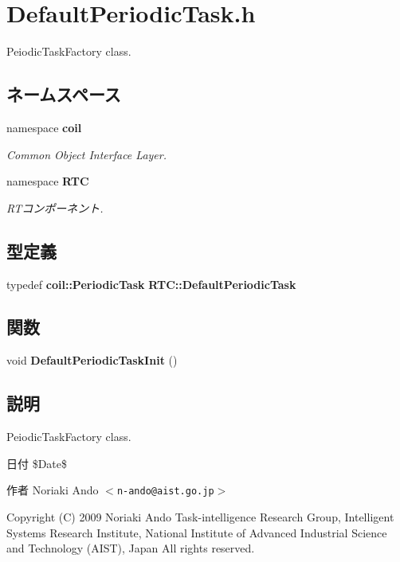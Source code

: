 \section{DefaultPeriodicTask.h}
\label{DefaultPeriodicTask_8h}


PeiodicTaskFactory class.  


\subsection*{ネームスペース}
\begin{DoxyCompactItemize}
\item 
namespace {\bf coil}


\begin{DoxyCompactList}\small\item\em Common Object Interface Layer. \item\end{DoxyCompactList}

\item 
namespace {\bf RTC}


\begin{DoxyCompactList}\small\item\em RTコンポーネント. \item\end{DoxyCompactList}

\end{DoxyCompactItemize}
\subsection*{型定義}
\begin{DoxyCompactItemize}
\item 
typedef {\bf coil::PeriodicTask} {\bf RTC::DefaultPeriodicTask}
\end{DoxyCompactItemize}
\subsection*{関数}
\begin{DoxyCompactItemize}
\item 
void {\bf DefaultPeriodicTaskInit} ()
\end{DoxyCompactItemize}


\subsection{説明}
PeiodicTaskFactory class. \begin{DoxyDate}{日付}
\$Date\$ 
\end{DoxyDate}
\begin{DoxyAuthor}{作者}
Noriaki Ando $<${\tt n-\/ando@aist.go.jp}$>$
\end{DoxyAuthor}
Copyright (C) 2009 Noriaki Ando Task-\/intelligence Research Group, Intelligent Systems Research Institute, National Institute of Advanced Industrial Science and Technology (AIST), Japan All rights reserved.

